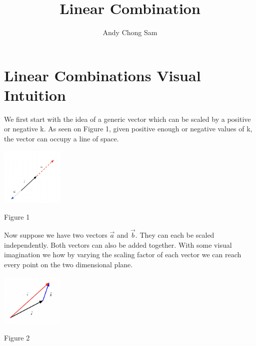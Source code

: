 \documentclass{article}
\begin{document}
	
\title{Linear Combination}
\author{Andy Chong Sam}

\maketitle	

\section{Linear Combinations Visual Intuition}
\begin{minipage}[c]{.5\linewidth}
	\par \noindent We first start with the idea of a generic vector which can be scaled by a positive or negative k. As seen on Figure 1, given positive enough or negative values of k, the vector can occupy a line of space.
\end{minipage}%
\begin{minipage}[c]{.5\linewidth}
\begin{center}
	\includegraphics[width=3cm]{matrix-scaling-1.png}
\end{center}
\begin{center}
	Figure 1	
\end{center}
\end{minipage}
\linebreak
\linebreak
\linebreak
\begin{minipage}[c]{.5\linewidth}
	\par \noindent Now suppose we have two vectors \( \vec a \) and \( \vec b \).  They can each be scaled independently. Both vectors can also be added together. With some visual imagination we how by varying the scaling factor of each vector we can reach every point on the two dimensional plane.
\end{minipage}%
\begin{minipage}[c]{.5\linewidth}
\begin{center}
	\includegraphics[width=3cm]{vector-scaling-2.png}
\end{center}
\begin{center}
	Figure 2	
\end{center}
\end{minipage}
\end{document}
